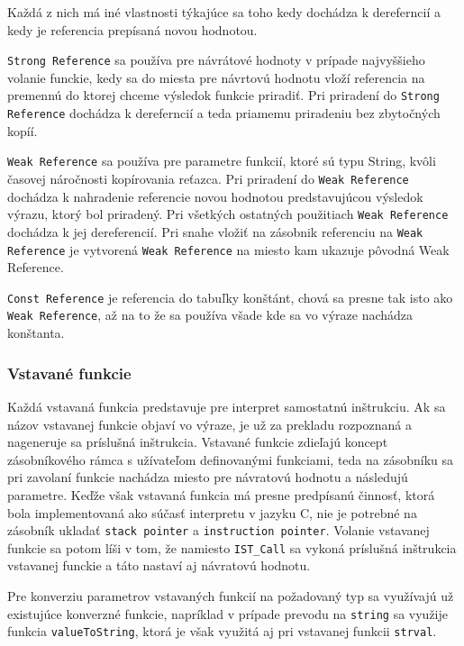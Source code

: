 \documentclass[12pt,a4paper,titlepage,final]{article}
\begin{document}
Každá z nich má iné vlastnosti týkajúce sa toho kedy dochádza k dereferncií a kedy
je referencia prepísaná novou hodnotou.

\texttt{Strong Reference} sa používa pre návrátové hodnoty v prípade najvyššieho volanie funckie,
kedy sa do miesta pre návrtovú hodnotu vloží referencia na premennú do ktorej chceme
výsledok funkcie priradiť. Pri priradení do \texttt{Strong Reference} dochádza k dereferncií a teda
priamemu priradeniu bez zbytočných kopíí.

\texttt{Weak Reference} sa používa pre parametre funkcií, ktoré sú typu String, kvôli časovej náročnosti
kopírovania reťazca. Pri priradení do \texttt{Weak Reference} dochádza k nahradenie referencie
novou hodnotou predstavujúcou výsledok výrazu, ktorý bol priradený. Pri všetkých ostatných použitiach
\texttt{Weak Reference} dochádza k jej dereferencií. Pri snahe vložiť na zásobnik referenciu na \texttt{Weak Reference}
je vytvorená \texttt{Weak Reference} na miesto kam ukazuje pôvodná Weak Reference.

\texttt{Const Reference} je referencia do tabuľky konštánt, chová sa presne tak isto ako \texttt{Weak Reference},
až na to že sa používa všade kde sa vo výraze nachádza konštanta.

\subsubsection{Vstavané funkcie}
Každá vstavaná funkcia predstavuje pre interpret samostatnú inštrukciu. Ak sa
názov vstavanej funkcie objaví vo výraze, je už za prekladu rozpoznaná a 
nageneruje sa príslušná inštrukcia. Vstavané funkcie zdieľajú koncept zásobníkového
rámca s užívateľom definovanými funkciami, teda na zásobníku sa pri zavolaní funkcie 
nachádza miesto pre návratovú hodnotu a následujú parametre. Keďže však vstavaná funkcia
má presne predpísanú činnosť, ktorá bola implementovaná ako súčasť interpretu v jazyku C,
nie je potrebné na zásobník ukladať \texttt{stack pointer} a \texttt{instruction pointer}.
Volanie vstavanej funkcie sa potom líši v tom, že namiesto \texttt{IST\_Call} sa vykoná 
príslušná inštrukcia vstavanej funckie a táto nastaví aj návratovú hodnotu.

Pre konverziu parametrov vstavaných funkcií na požadovaný typ sa využívajú už existujúce
konverzné funkcie, napríklad v prípade prevodu na \texttt{string} sa využije funkcia
\texttt{valueToString}, ktorá je však využitá aj pri vstavanej funkcii \texttt{strval}.
\newpage
\end{document}
